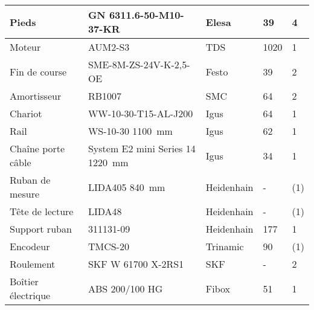 \begin{table}[H]
{\begin{tabular}{|l|l|l|l|l|}
            Pieds                  & GN 6311.6-50-M10-37-KR           & Elesa \cite{Elesa}              & 39                         & 4                 \\ \hline
            Moteur                 & AUM2-S3                          & TDS \cite{TDSPrecisionProducts} & 1020                       & 1                 \\ \hline
            Fin de course          & SME-8M-ZS-24V-K-2,5-OE           & Festo \cite{Festo}              & 39                         & 2                 \\ \hline
            Amortisseur            & RB1007                           & SMC \cite{SMC}                  & 64                         & 2                 \\ \hline
            Chariot                & WW-10-30-T15-AL-J200             & Igus \cite{Igus}                & 64                         & 1                 \\ \hline
            Rail                   & WS-10-30 1100~mm                 & Igus \cite{Igus}                & 62                         & 1                 \\ \hline
            Chaîne porte câble     & System E2 mini Series 14 1220~mm & Igus \cite{Igus}                & 34                         & 1                 \\ \hline
            Ruban de mesure        & LIDA405 840~mm                   & Heidenhain \cite{Heidenhain}    & -                          & (1)               \\ \hline
            Tête de lecture        & LIDA48                           & Heidenhain \cite{Heidenhain}    & -                          & (1)               \\ \hline
            Support ruban          & 311131-09                        & Heidenhain \cite{Heidenhain}    & 177                        & 1                 \\ \hline
            Encodeur               & TMCS-20                          & Trinamic \cite{Trinamic}        & 90                         & (1)               \\ \hline
            Roulement              & SKF W 61700 X-2RS1               & SKF \cite{SKF}                  & -                          & 2                 \\ \hline
            Boîtier électrique     & ABS 200/100 HG                   & Fibox \cite{Fibox}              & 51                         & 1                 \\ \hline

\end{tabular}}
\end{table}
